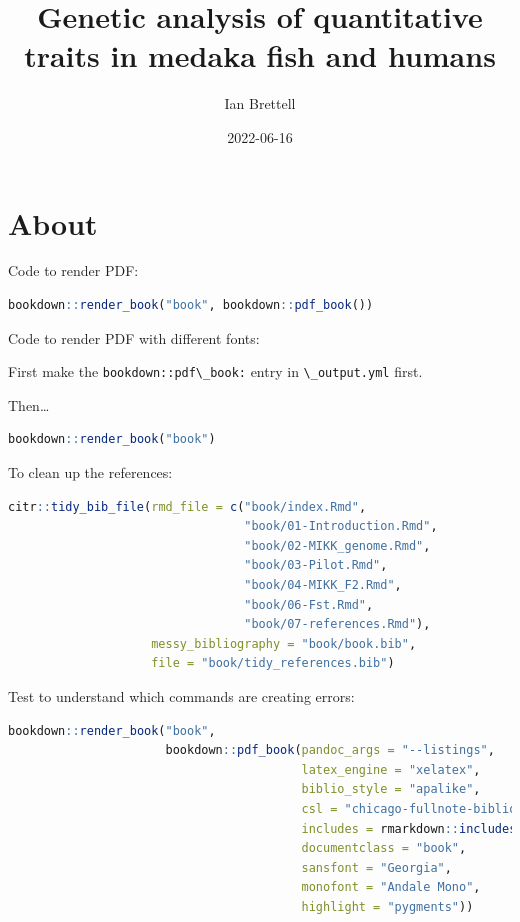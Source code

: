 \documentclass[
]{book}
\title{Genetic analysis of quantitative traits in medaka fish and humans}
\author{Ian Brettell}
\date{2022-06-16}
\newcommand{\passthrough}[1]{#1}
\begin{document}
\maketitle

{
\setcounter{tocdepth}{1}
\tableofcontents
}
\hypertarget{about}{%
\chapter*{About}\label{about}}

Code to render PDF:

\begin{lstlisting}[language=R]
bookdown::render_book("book", bookdown::pdf_book())
\end{lstlisting}

Code to render PDF with different fonts:

First make the \passthrough{\lstinline!bookdown::pdf\_book:!} entry in \passthrough{\lstinline!\_output.yml!} first.

Then\ldots{}

\begin{lstlisting}[language=R]
bookdown::render_book("book")
\end{lstlisting}

To clean up the references:

\begin{lstlisting}[language=R]
citr::tidy_bib_file(rmd_file = c("book/index.Rmd",
                                 "book/01-Introduction.Rmd",
                                 "book/02-MIKK_genome.Rmd",
                                 "book/03-Pilot.Rmd",
                                 "book/04-MIKK_F2.Rmd",
                                 "book/06-Fst.Rmd",
                                 "book/07-references.Rmd"),
                    messy_bibliography = "book/book.bib",
                    file = "book/tidy_references.bib")
\end{lstlisting}

Test to understand which commands are creating errors:

\begin{lstlisting}[language=R]
bookdown::render_book("book",
                      bookdown::pdf_book(pandoc_args = "--listings",
                                         latex_engine = "xelatex",
                                         biblio_style = "apalike",
                                         csl = "chicago-fullnote-bibliography.csl",
                                         includes = rmarkdown::includes(in_header = "preamble.tex"),
                                         documentclass = "book",
                                         sansfont = "Georgia",
                                         monofont = "Andale Mono",
                                         highlight = "pygments"))
\end{lstlisting}
\end{document}
